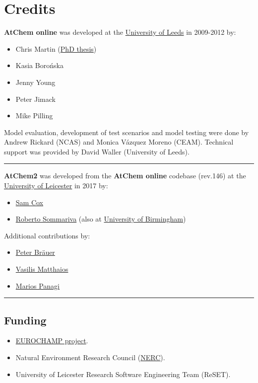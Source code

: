 \section{Credits} \label{sec:credits}

\textbf{AtChem online} was developed at the
\href{https://www.leeds.ac.uk}{University of Leeds} in 2009-2012 by:

\begin{itemize}
\item Chris Martin (\href{http://etheses.whiterose.ac.uk/1596/}{PhD thesis})
\item Kasia Boro{\'n}ska
\item Jenny Young
\item Peter Jimack
\item Mike Pilling
\end{itemize}

Model evaluation, development of test scenarios and model testing were
done by Andrew Rickard (NCAS) and Monica V{\'a}zquez Moreno (CEAM).
Technical support was provided by David Waller (University of Leeds).

\begin{center}\rule{0.5\linewidth}{\linethickness}\end{center}

\textbf{AtChem2} was developed from the \textbf{AtChem online} codebase
(rev.146) at the \href{https://le.ac.uk}{University of Leicester} in
2017 by:

\begin{itemize}
\item \href{https://github.com/spco}{Sam Cox}
\item \href{https://github.com/rs028}{Roberto Sommariva} (also at
  \href{https://www.birmingham.ac.uk}{University of Birmingham})
\end{itemize}

Additional contributions by:

\begin{itemize}
\item \href{https://github.com/pb866}{Peter Br{\"a}uer}
\item \href{https://github.com/kailas29}{Vasilis Matthaios}
\item \href{https://github.com/mpanagi}{Marios Panagi}
\end{itemize}

\begin{center}\rule{0.5\linewidth}{\linethickness}\end{center}

\hypertarget{funding}{%
\subsection{Funding}\label{funding}}

\begin{itemize}
\item \href{https://www.eurochamp.org/}{EUROCHAMP project}.
\item Natural Environment Research Council
  (\href{https://www.nerc.ac.uk/}{NERC}).
\item University of Leicester Research Software Engineering Team (ReSET).
\end{itemize}
